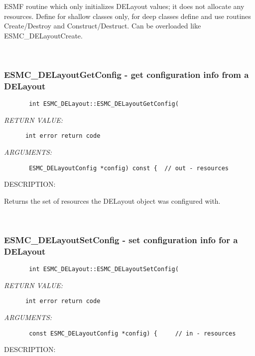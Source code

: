        ESMF routine which only initializes DELayout values; it does not
        allocate any resources.  Define for shallow classes only,
        for deep classes define and use routines Create/Destroy and
        Construct/Destruct.  Can be overloaded like ESMC\_DELayoutCreate.
   
 
\mbox{}\hrulefill\ 
 
\subsubsection{ESMC\_DELayoutGetConfig - get configuration info from a DELayout}


  
\begin{verbatim}       int ESMC_DELayout::ESMC_DELayoutGetConfig(\end{verbatim}{\em RETURN VALUE:}
\begin{verbatim}      int error return code\end{verbatim}{\em ARGUMENTS:}
\begin{verbatim}       ESMC_DELayoutConfig *config) const {  // out - resources\end{verbatim}
{\sf DESCRIPTION:\\ }


      Returns the set of resources the DELayout object was configured with.
   
 
\mbox{}\hrulefill\ 
 
\subsubsection{ESMC\_DELayoutSetConfig - set configuration info for a DELayout}


  
\begin{verbatim}       int ESMC_DELayout::ESMC_DELayoutSetConfig(\end{verbatim}{\em RETURN VALUE:}
\begin{verbatim}      int error return code\end{verbatim}{\em ARGUMENTS:}
\begin{verbatim}       const ESMC_DELayoutConfig *config) {     // in - resources\end{verbatim}
{\sf DESCRIPTION:\\ }


